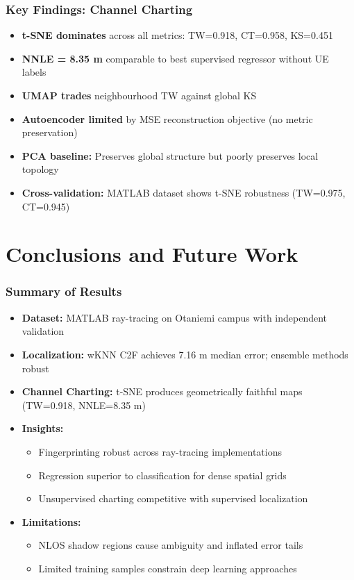 \documentclass{beamer}
\begin{document}
\begin{frame}
\frametitle{Key Findings: Channel Charting}
\begin{itemize}
  \item \textbf{t-SNE dominates} across all metrics: TW=0.918, CT=0.958, KS=0.451
  \item \textbf{NNLE = 8.35 m} comparable to best supervised regressor without UE labels
  \item \textbf{UMAP trades} neighbourhood TW against global KS
  \item \textbf{Autoencoder limited} by MSE reconstruction objective (no metric preservation)
  \item \textbf{PCA baseline:} Preserves global structure but poorly preserves local topology
  \item \textbf{Cross-validation:} MATLAB dataset shows t-SNE robustness (TW=0.975, CT=0.945)
\end{itemize}
\end{frame}

\section{Conclusions and Future Work}

\begin{frame}
\frametitle{Summary of Results}
\begin{itemize}
  \item \textbf{Dataset:} MATLAB ray-tracing on Otaniemi campus with independent validation
  \item \textbf{Localization:} wKNN C2F achieves 7.16 m median error; ensemble methods robust
  \item \textbf{Channel Charting:} t-SNE produces geometrically faithful maps (TW=0.918, NNLE=8.35 m)
  \item \textbf{Insights:}
  \begin{itemize}
    \item Fingerprinting robust across ray-tracing implementations
    \item Regression superior to classification for dense spatial grids
    \item Unsupervised charting competitive with supervised localization
  \end{itemize}
  \item \textbf{Limitations:}
  \begin{itemize}
    \item NLOS shadow regions cause ambiguity and inflated error tails
    \item Limited training samples constrain deep learning approaches
  \end{itemize}
\end{itemize}
\end{frame}
\end{document}
